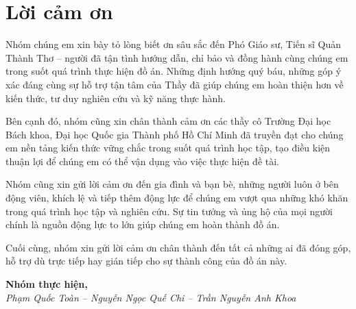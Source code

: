 \section*{Lời cảm ơn}
\thispagestyle{empty}
Nhóm chúng em xin bày tỏ lòng biết ơn sâu sắc đến Phó Giáo sư, Tiến sĩ Quản Thành Thơ – người đã tận tình hướng dẫn, chỉ bảo và đồng hành cùng chúng em trong suốt quá trình thực hiện đồ án. Những định hướng quý báu, những góp ý xác đáng cùng sự hỗ trợ tận tâm của Thầy đã giúp chúng em hoàn thiện hơn về kiến thức, tư duy nghiên cứu và kỹ năng thực hành. 

Bên cạnh đó, nhóm cũng xin chân thành cảm ơn các thầy cô Trường Đại học Bách khoa, Đại học Quốc gia Thành phố Hồ Chí Minh đã truyền đạt cho chúng em nền tảng kiến thức vững chắc trong suốt quá trình học tập, tạo điều kiện thuận lợi để chúng em có thể vận dụng vào việc thực hiện đề tài. 

Nhóm cũng xin gửi lời cảm ơn đến gia đình và bạn bè, những người luôn ở bên động viên, khích lệ và tiếp thêm động lực để chúng em vượt qua những khó khăn trong quá trình học tập và nghiên cứu. Sự tin tưởng và ủng hộ của mọi người chính là nguồn động lực to lớn giúp chúng em hoàn thành đồ án. 

Cuối cùng, nhóm xin gửi lời cảm ơn chân thành đến tất cả những ai đã đóng góp, hỗ trợ dù trực tiếp hay gián tiếp cho sự thành công của đồ án này.

\vspace{1cm}

\begin{flushright}
\textbf{Nhóm thực hiện,}\\[0.3cm]
\textit{Phạm Quốc Toàn -- Nguyễn Ngọc Quế Chi -- Trần Nguyễn Anh Khoa}
\end{flushright}

\clearpage
{}

